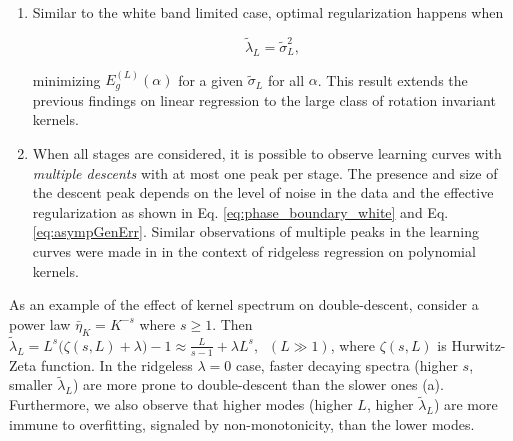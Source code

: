 \documentclass[11pt]{article}
\begin{document}
\begin{enumerate}[noitemsep,topsep=0pt,leftmargin=*]
\item Similar to the white band limited case,  optimal regularization happens when
\begin{linenomath*}\begin{equation}
    \tilde\lambda_{L}=\tilde \sigma_L^2,
\end{equation}\end{linenomath*}
minimizing $E_g^{(L)}(\alpha)$ for a given $\tilde \sigma_L$ for all $\alpha$. This result extends the previous findings on linear regression \cite{nakkiran2020optimal} to the large class of rotation invariant kernels.
\item When all stages are considered, it is possible to observe learning curves with \textit{multiple descents} with at most one peak per stage. The presence and size of the descent peak depends on the level of noise in the data and the effective regularization as shown in Eq. \eqref{eq:phase_boundary_white} and Eq. \eqref{eq:asympGenErr}. Similar observations of multiple peaks in the learning curves were made in \cite{liang_isometry} in the context of ridgeless regression on polynomial kernels.
\end{enumerate}


As an example of the effect of kernel spectrum on double-descent, consider a power law $\bar\eta_K = K^{-s}$ where $s\geq 1$. Then $\tilde\lambda_L=L^s\big(\zeta(s,L )+\lambda\big)-1 \approx \frac{L}{s-1}+\lambda L^s,\;\;(L\gg 1)$, where $\zeta(s,L)$ is Hurwitz-Zeta function. In the ridgeless $\lambda = 0$ case, faster decaying spectra (higher $s$, smaller $\tilde\lambda_L$) are more prone to double-descent than the slower ones (a). Furthermore, we also observe that higher modes (higher $L$, higher $\tilde\lambda_L$) are more immune to overfitting, signaled by non-monotonicity, than the lower modes.
\end{document}
